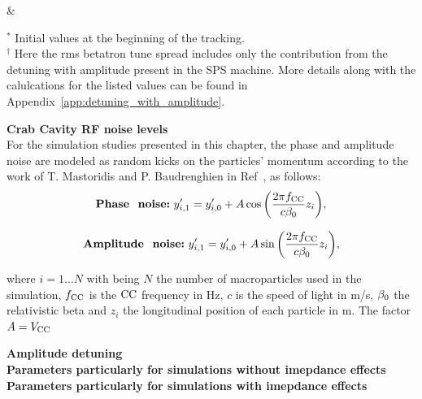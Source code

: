\begin{table}[!hbt]
\begin{minipage}{\textwidth}
\begin{centering}
\begin{tabu}
        & \\
      \bottomrule
	\end{tabu}
   \label{tab:sps_pyheadtail_emit_growth_parameters}
   \end{centering} \footnotesize{$^\ast$ Initial values at the beginning of the tracking.\\$^\dagger$ Here the rms betatron tune spread includes only the contribution from the detuning with amplitude present in the SPS machine. More details along with the calulcations for the listed values can be found in Appendix~\ref{app:detuning_with_amplitude}.}
   \end{minipage}
\end{table}

\normalsize{\textbf{Crab Cavity RF noise levels}}\\
For the simulation studies presented in this chapter, the phase and amplitude noise are modeled as random kicks on the particles' momentum according to the work of T. Mastoridis and P. Baudrenghien in Ref~\cite{PhysRevSTAB.18.101001}, as follows:
\begin{equation}
    \mathrm{\textbf{Phase \ noise:}} \ y^\prime_{i,1} = y^\prime_{i, 0} + A \cos{\left ( \frac{2\pi \fCC}{c \betarel}z_i \right )},
\end{equation}

\begin{equation}
    \mathrm{\textbf{Amplitude \ noise:}} \ y^\prime_{i, 1} = y^\prime_{i, 0} + A \sin{\left ( \frac{2\pi \fCC}{c \betarel}z_i \right )},
\end{equation}

where $i=1...N$ with being $N$ the number of macroparticles used in the simulation,  ${f_\mathrm{CC}}$ is the ${\mathrm{CC}}$ frequency in Hz, $c$ is the speed of light in m/s, ${\beta_0}$ the relativistic beta and $z_i$ the longitudinal position of each particle in m. The factor $A={V_\mathrm{CC}}$





\normalsize{\textbf{Amplitude detuning}}\\
\normalsize{\textbf{Parameters particularly for simulations without imepdance effects}}\\
\normalsize{\textbf{Parameters particularly for simulations with imepdance effects}}\\


